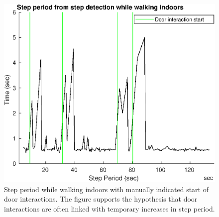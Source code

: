 \begin{figure}[H]
	\centering
	\includegraphics[width=0.55\linewidth]{images/20201122_1605_Step_period_from_step_detection_while_walking_indoors}
		\setlength{\belowcaptionskip}{-30pt}
	\caption{Step period while walking indoors with manually indicated start of door interactions. The figure supports the hypothesis that door interactions are often linked with temporary increases in step period.}
	\label{fig:step_period_from_step_detection_while_walking_indoors}
\end{figure}

